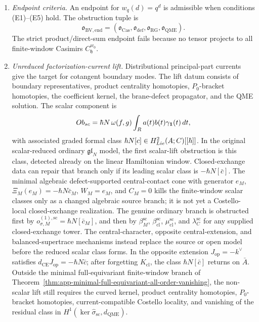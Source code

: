 \begin{enumerate}
  \item \emph{Endpoint criteria.}
  An endpoint for \(w_q(d)=q^d\) is admissible when conditions
  (E1)--(E5) hold.  The obstruction tuple is
  \[
    \mathfrak o_{\mathrm{BV,end}}=
    (\mathfrak o_{\mathrm{Cas}},
     \mathfrak o_{\mathrm{def}},
     \mathfrak o_{\mathrm{RG}},
     \mathfrak o_{\mathrm{QME}}).
  \]
  The strict product/direct-sum endpoint fails because no tensor
  projects to all finite-window Casimirs \(C_{\mathfrak h}^{w_0}\).

  \item \emph{Unreduced factorization-current lift.}
  Distributional principal-part currents give the target for cotangent
  boundary modes.  The lift datum consists of boundary representatives,
  product centrality homotopies, \(P_0\)-bracket homotopies, the
  coefficient kernel, the brane-defect propagator, and the QME solution.
  The scalar component is
  \[
    Ob_{sc}
    =\hbar N\,\omega(f,g)
      \int_{R} a(t)b(t)\gamma_{\mathbf 1}(t)\,dt ,
	  \]
	  with associated graded formal class
	  \(\hbar N[c]\in H^2_{Lie}(A;C)[[\hbar]]\).
	  In the original scalar-reduced ordinary \(\mathfrak{gl}_N\) model,
	  the first scalar-lift obstruction is this class, detected already on
	  the linear Hamiltonian window.  Closed-exchange data can repair that
	  branch only if its leading scalar class is
	  \(-\hbar N[\bar c]\).  The minimal algebraic defect-supported
	  central-contact cone with generator \(e_M\),
	  \(\Xi_M(e_M)=-\hbar N\bar c_M\), \(W_M=e_M\), and \(C_M=0\)
	  kills the finite-window scalar classes only as a changed algebraic
	  source branch; it is not yet a Costello-local closed-exchange
	  realization.  The genuine ordinary branch is obstructed first by
	  \(o_{\sigma,M}^{(1),\mathrm{sc}}=\hbar N[\bar c_M]\), and then by
	  \(\beta^{\mathrm{sc}}_M\),
	  \(\beta^{\mathrm{sc}}_{\mathrm{cl}}\),
	  \(\mu^{\mathrm{sc}}_{\mathrm{cl}}\), and
	  \(\lambda^{\mathrm{sc}}_C\) for any supplied closed-exchange tower.
	  The central-character, opposite central-extension, and
	  balanced-supertrace mechanisms instead replace the source or open model
	  before the reduced scalar class forms.  In the opposite extension
	  \(J_{\mathrm{op}}=-k^\vee\) satisfies
	  \(d_{\mathrm{CE}}J_{\mathrm{op}}=-\hbar N\bar c\); after forgetting
	  \(K_{\mathrm{cl}}\), the class \(\hbar N[\bar c]\) returns on
	  \(\bar A\).  Outside the minimal
	  full-equivariant finite-window branch of
	  Theorem~\ref{thm:app-minimal-full-equivariant-all-order-vanishing},
	  the non-scalar lift still requires the curved kernel, product
	  centrality homotopies, \(P_0\)-bracket homotopies,
	  current-compatible Costello locality, and vanishing of the residual
	  class in
	  \(H^1(\ker\widehat\sigma_{\mathrm{sc}},d_{\mathrm{QME}})\).


\end{enumerate}
